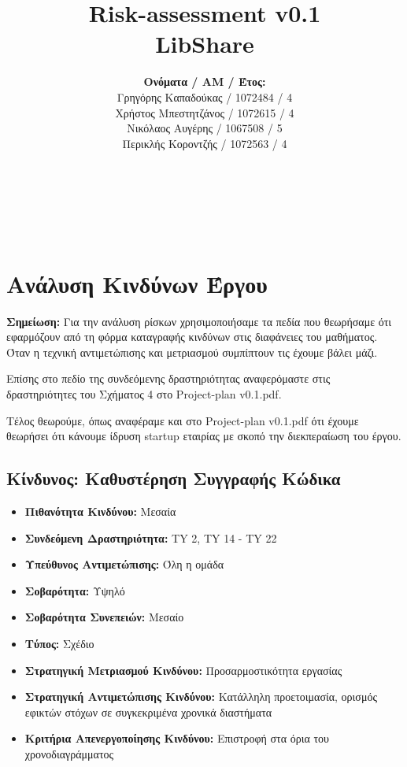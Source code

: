 \documentclass[12pt,a4paper]{article}
\title{Risk-assessment v0.1\\ LibShare}
\author{\textbf{Ονόματα / ΑΜ / Έτος:} \\ Γρηγόρης Καπαδούκας / 1072484 / 4\textdegree \\ Χρήστος Μπεστητζάνος / 1072615 / 4\textdegree \\ Νικόλαος Αυγέρης / 1067508 / 5\textdegree \\ Περικλής Κοροντζής / 1072563 / 4\textdegree}
\begin{document}
\makeatletter
\begin{center}
	\LARGE{\@title} \\
	\pagebreak
\end{center}
\begin{LARGE}\@author\end{LARGE} \\
\pagebreak

\section{Ανάλυση Κινδύνων Έργου}

\textbf{Σημείωση:} Για την ανάλυση ρίσκων χρησιμοποιήσαμε τα πεδία που θεωρήσαμε ότι εφαρμόζουν από τη φόρμα καταγραφής κινδύνων στις διαφάνειες του μαθήματος. Όταν η τεχνική αντιμετώπισης και μετριασμού συμπίπτουν τις έχουμε βάλει μάζι.

Επίσης στο πεδίο της συνδεόμενης δραστηριότητας αναφερόμαστε στις δραστηριότητες του Σχήματος 4 στο Project-plan v0.1.pdf.

Τέλος θεωρούμε, όπως αναφέραμε και στο Project-plan v0.1.pdf ότι έχουμε θεωρήσει ότι κάνουμε ίδρυση startup εταιρίας με σκοπό την διεκπεραίωση του έργου.

\subsection{Κίνδυνος: Καθυστέρηση Συγγραφής Κώδικα}
\begin{itemize}
	\item \textbf{Πιθανότητα Κινδύνου:} Μεσαία
	\item \textbf{Συνδεόμενη Δραστηριότητα:} TY 2, TY 14 - TY 22
	\item \textbf{Υπεύθυνος Αντιμετώπισης:} Όλη η ομάδα
	\item \textbf{Σοβαρότητα:} Υψηλό
	\item \textbf{Σοβαρότητα Συνεπειών:} Μεσαίο
	\item \textbf{Τύπος:} Σχέδιο
	\item \textbf{Στρατηγική Μετριασμού Κινδύνου:} Προσαρμοστικότητα εργασίας
	\item \textbf{Στρατηγική Αντιμετώπισης Κινδύνου:} Κατάλληλη προετοιμασία, ορισμός εφικτών στόχων σε συγκεκριμένα χρονικά διαστήματα
	\item \textbf{Κριτήρια Απενεργοποίησης Κινδύνου:} Επιστροφή στα όρια του χρονοδιαγράμματος
\end{itemize}
\end{document}
